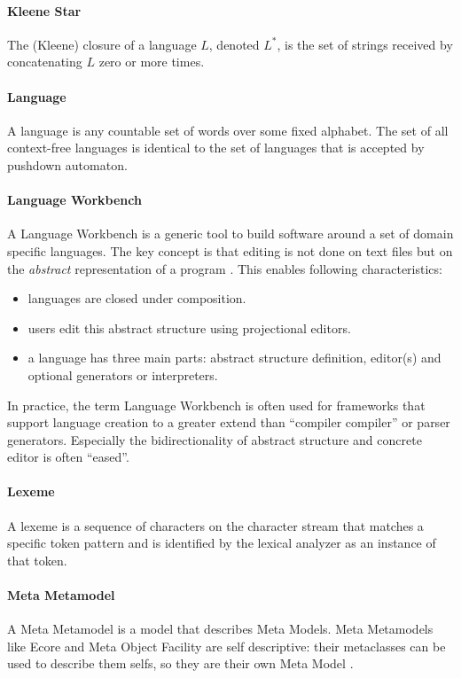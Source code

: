 \paragraph{Kleene Star} 
The (Kleene) closure of a language $L$, denoted $L^*$, is the set of strings received by concatenating $L$ zero or more times. \cite{DragonBook}

\paragraph{Language} 
A language is any countable set of words over some fixed alphabet. The set of all context-free languages is identical to the set of languages that is accepted by pushdown automaton. \cite{DragonBook}

\paragraph{Language Workbench}
A Language Workbench is a generic tool to build software around a set of domain specific languages. The key concept is that editing is not done on text files but on the \emph{abstract} representation of a program \cite{Fowler}. This enables following characteristics:
\begin{itemize}
	\item languages are closed under composition.
	\item users edit this abstract structure using projectional editors.
	\item a language has three main parts: abstract structure definition, editor(s) and optional generators or interpreters.
\end{itemize}
In practice, the term Language Workbench is often used for frameworks that support language creation to a greater extend than ``compiler compiler'' or parser generators. Especially the bidirectionality of abstract structure and concrete editor is often ``eased''. 

\paragraph{Lexeme}
A lexeme is a sequence of characters on the character stream that matches a specific token pattern and is identified by the lexical analyzer as an instance of that token. \cite{DragonBook}

\paragraph{Meta Metamodel} A Meta Metamodel is a model that describes Meta Models. Meta Metamodels like Ecore and Meta Object Facility are self descriptive: their metaclasses can be used to describe them selfs, so they are their own Meta Model \cite{EMF2nd}.

